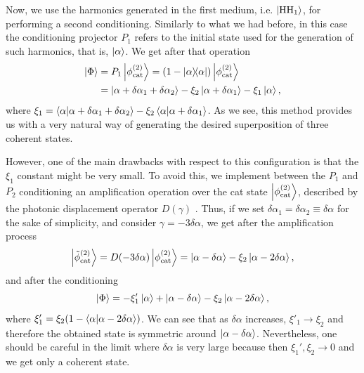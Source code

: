 Now, we use the harmonics generated in the first medium, i.e. $\ket{\text{HH}_1}$, for performing a second conditioning. Similarly to what we had before, in this case the conditioning projector $P_1$ refers to the initial state used for the generation of such harmonics, that is, $\ket{\alpha}$. We get after that operation
\begin{equation}
    \begin{aligned}
    \ket{\Phi} 
    &= P_1 \ket{\phi_\text{cat}^{(2)}}
    = (1-\dyad{\alpha})
    \ket{\phi_\text{cat}^{(2)}}\\
    &= \ket{\alpha + \delta \alpha_1 + \delta \alpha_2}
        - \xi_2 \ket{\alpha + \delta \alpha_1}
        - \xi_1 \ket{\alpha},
    \end{aligned}
\end{equation}
where $\xi_1 =  \braket{\alpha}{\alpha + \delta \alpha_1 + \delta \alpha_2} - \xi_2 \braket{\alpha}{\alpha + \delta\alpha_1}$. As we see, this method provides us with a very natural way of generating the desired superposition of three coherent states.

However, one of the main drawbacks with respect to this configuration is that the $\xi_1$ constant might be very small. To avoid this, we implement between the $P_1$ and $P_2$ conditioning an amplification operation over the cat state $\ket{\phi_\text{cat}^{(2)}}$, described by the photonic displacement operator $D(\gamma)$ \cite{ScullyBook}. Thus, if we set $\delta \alpha_1 = \delta \alpha_2 \equiv \delta \alpha$ for the sake of simplicity, and consider $\gamma = - 3 \delta \alpha$, we get after the amplification process
\begin{equation}
    \ket{\Tilde{\phi}_\text{cat}^{(2)}}
    = D(-3\delta \alpha) \ket{\phi_\text{cat}^{(2)}}
    = \ket{\alpha - \delta \alpha}
    - \xi_2\ket{\alpha - 2 \delta \alpha},
\end{equation}
and after the conditioning
\begin{equation}\label{Enhanced:Superposition}
    \ket{\Phi}
        = 
            - \xi'_1 \ket{\alpha}
                +\ket{\alpha - \delta \alpha}
                - \xi_2 \ket{\alpha - 2\delta \alpha},
\end{equation}
where $\xi'_1 = \xi_2(1 - \braket{\alpha}{\alpha-2\delta\alpha})$. We can see that as $\delta \alpha$ increases, $\xi'_1 \to \xi_2$ and therefore the obtained state is symmetric around $\ket{\alpha - \delta \alpha}$. Nevertheless, one should be careful in the limit where $\delta \alpha$ is very large because then $\xi_1',\xi_2 \to 0$ and we get only a coherent state. 


